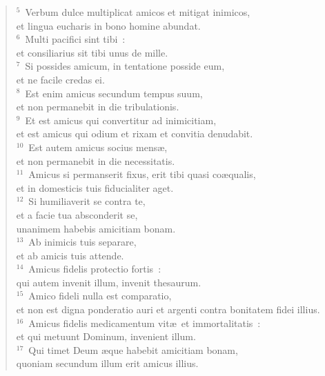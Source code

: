 \begin{verse}${}^{5}$~Verbum dulce multiplicat amicos et mitigat inimicos,\\ et lingua eucharis in bono homine abundat.\\
${}^{6}$~Multi pacifici sint tibi~:\\ et consiliarius sit tibi unus de mille.\\
${}^{7}$~Si possides amicum, in tentatione posside eum,\\ et ne facile credas ei.\\
${}^{8}$~Est enim amicus secundum tempus suum,\\ et non permanebit in die tribulationis.\\
${}^{9}$~Et est amicus qui convertitur ad inimicitiam,\\ et est amicus qui odium et rixam et convitia denudabit.\\
${}^{10}$~Est autem amicus socius mens\ae ,\\ et non permanebit in die necessitatis.\\
${}^{11}$~Amicus si permanserit fixus, erit tibi quasi co\ae qualis,\\ et in domesticis tuis fiducialiter aget.\\
${}^{12}$~Si humiliaverit se contra te,\\ et a facie tua absconderit se,\\ unanimem habebis amicitiam bonam.\\
${}^{13}$~Ab inimicis tuis separare,\\ et ab amicis tuis attende.\\
${}^{14}$~Amicus fidelis protectio fortis~:\\ qui autem invenit illum, invenit thesaurum.\\
${}^{15}$~Amico fideli nulla est comparatio,\\ et non est digna ponderatio auri et argenti contra bonitatem fidei illius.\\
${}^{16}$~Amicus fidelis medicamentum vit\ae\ et immortalitatis~:\\ et qui metuunt Dominum, invenient illum.\\
${}^{17}$~Qui timet Deum \ae que habebit amicitiam bonam,\\ quoniam secundum illum erit amicus illius.\end{verse}


